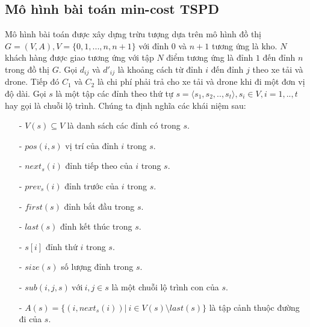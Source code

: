 \documentclass[a4paper,12pt]{report}
\begin{document}
\subsection{Mô hình bài toán min-cost TSPD}
Mô hình bài toán được xây dựng trừu tượng dựa trên mô hình đồ thị $G=(V,A), V=\{0,1,...,n,n+1\}$ với đỉnh $0$ và $n+1$ tương ứng là kho. $N$ khách hàng được giao tương ứng với tập $N$ điểm tương ứng là đỉnh $1$ đến đỉnh $n$ trong đồ thị $G$. Gọi $d_{ij}$ và $d'_{ij}$ là khoảng cách từ đỉnh $i$ đến đỉnh $j$ theo xe tải và drone. Tiếp đó $C_1$ và $C_2$ là chi phí phải trả cho xe tải và drone khi đi một đơn vị độ dài.  
Gọi $s$ là một tập các đỉnh theo thứ tự $s=\langle s_1,s_2,..,s_t \rangle , s_i \in V, i=1,..,t$ hay gọi là chuỗi lộ trình. Chúng ta định nghĩa các khái niệm sau:

\begin{itemize}
\item[-] $V(s) \subseteq V$ là danh sách các đỉnh có trong $s$.
\item[-] $pos(i,s)$ vị trí của đỉnh $i$ trong $s$.
\item[-] $next_s(i)$ đỉnh tiếp theo của $i$ trong $s$.
\item[-] $prev_s(i)$ đỉnh trước của $i$ trong $s$.
\item[-] $first(s)$ đỉnh bắt đầu trong $s$.
\item[-] $last(s)$ đỉnh kết thúc trong $s$.
\item[-] $s[i]$ đỉnh thứ $i$ trong $s$.
\item[-] $size(s)$ số lượng đỉnh trong $s$.
\item[-] $sub(i,j,s) \ \text{với} \ i,j \in s $ là một chuỗi lộ trình con của $s$.
\item[-] $A(s)=\{(i,next_s(i))| \ i \in V(s)\setminus last(s)\}$ là tập cảnh thuộc đường đi của $s$.

\end{itemize}
\end{document}
